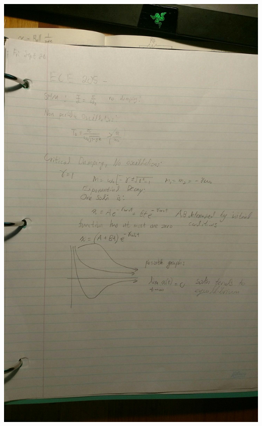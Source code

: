 \documentclass[11pt]{article}
\theoremstyle{definition}
\begin{document}
\includegraphics[width=\textwidth,height=\textheight,keepaspectratio]{friday/4.jpg}\\
\end{document}
